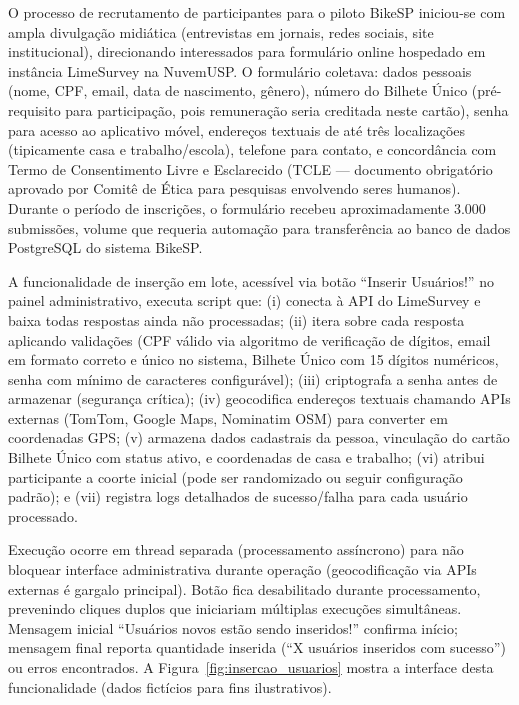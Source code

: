 

O processo de recrutamento de participantes para o piloto BikeSP iniciou-se com ampla divulgação midiática (entrevistas em jornais, redes sociais, site institucional), direcionando interessados para formulário online hospedado em instância LimeSurvey na NuvemUSP. O formulário coletava: dados pessoais (nome, CPF, email, data de nascimento, gênero), número do Bilhete Único (pré-requisito para participação, pois remuneração seria creditada neste cartão), senha para acesso ao aplicativo móvel, endereços textuais de até três localizações (tipicamente casa e trabalho/escola), telefone para contato, e concordância com Termo de Consentimento Livre e Esclarecido (TCLE --- documento obrigatório aprovado por Comitê de Ética para pesquisas envolvendo seres humanos). Durante o período de inscrições, o formulário recebeu aproximadamente 3.000 submissões, volume que requeria automação para transferência ao banco de dados PostgreSQL do sistema BikeSP.

A funcionalidade de inserção em lote, acessível via botão ``Inserir Usuários!'' no painel administrativo, executa script que: (i) conecta à API do LimeSurvey e baixa todas respostas ainda não processadas; (ii) itera sobre cada resposta aplicando validações (CPF válido via algoritmo de verificação de dígitos, email em formato correto e único no sistema, Bilhete Único com 15 dígitos numéricos, senha com mínimo de caracteres configurável); (iii) criptografa a senha antes de armazenar (segurança crítica); (iv) geocodifica endereços textuais chamando APIs externas (TomTom, Google Maps, Nominatim OSM) para converter em coordenadas GPS; (v) armazena dados cadastrais da pessoa, vinculação do cartão Bilhete Único com status ativo, e coordenadas de casa e trabalho; (vi) atribui participante a coorte inicial (pode ser randomizado ou seguir configuração padrão); e (vii) registra logs detalhados de sucesso/falha para cada usuário processado.

Execução ocorre em thread separada (processamento assíncrono) para não bloquear interface administrativa durante operação (geocodificação via APIs externas é gargalo principal). Botão fica desabilitado durante processamento, prevenindo cliques duplos que iniciariam múltiplas execuções simultâneas. Mensagem inicial ``Usuários novos estão sendo inseridos!'' confirma início; mensagem final reporta quantidade inserida (``X usuários inseridos com sucesso'') ou erros encontrados. A Figura~\ref{fig:insercao_usuarios} mostra a interface desta funcionalidade (dados fictícios para fins ilustrativos).

